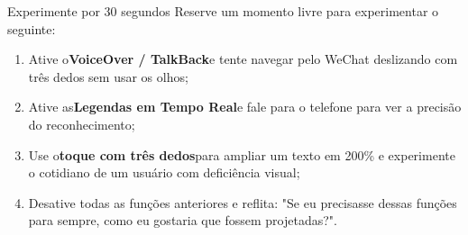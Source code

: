 \begin{tcbpractice}{Experimente por 30 segundos}
Reserve um momento livre para experimentar o seguinte:

\begin{enumerate}
  \item Ative o\textbf{VoiceOver / TalkBack}e tente navegar pelo WeChat deslizando com três dedos sem usar os olhos;
  \item Ative as\textbf{Legendas em Tempo Real}e fale para o telefone para ver a precisão do reconhecimento;
  \item Use o\textbf{toque com três dedos}para ampliar um texto em 200\% e experimente o cotidiano de um usuário com deficiência visual;
  \item Desative todas as funções anteriores e reflita: "Se eu precisasse dessas funções para sempre, como eu gostaria que fossem projetadas?".
\end{enumerate}

\end{tcbpractice}
